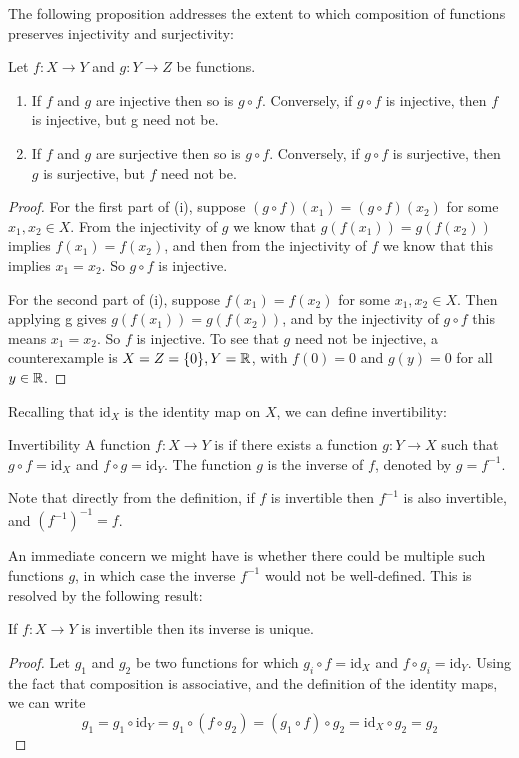 The following proposition addresses the extent to which composition of functions preserves injectivity and surjectivity:
\begin{proposition}
Let $f:X\to Y$ and $g:Y\to Z$ be functions.
\begin{enumerate}[label=(\roman*)]
\item If $f$ and $g$ are injective then so is $g \circ f$. Conversely, if $g \circ f$ is injective, then $f$ is injective, but g need not be.
\item If $f$ and $g$ are surjective then so is $g \circ f$. Conversely, if $g \circ f$ is surjective, then $g$ is surjective, but $f$ need not be.
\end{enumerate}
\end{proposition}
\begin{proof}
For the first part of (i), suppose $(g \circ f)(x_1) = (g \circ f)(x_2)$ for some $x_1, x_2 \in X$. From the injectivity of $g$ we know that $g(f(x_1)) = g(f(x_2))$ implies $f(x_1) = f(x_2)$, and then from the injectivity of $f$ we know that this implies $x_1 = x_2$. So $g \circ f$ is injective.

For the second part of (i), suppose $f(x_1) = f(x_2)$ for some $x_1, x_2 \in X$. Then applying g gives $g(f(x_1)) = g(f(x_2))$, and by the injectivity of $g \circ f$ this means $x_1 = x_2$. So $f$ is injective. To see that $g$ need not be injective, a counterexample is $X = Z = \{0\}, Y = \mathbb R$, with $f(0) = 0$ and $g(y) = 0$ for all $y \in \mathbb R$.
\end{proof}

Recalling that $\mathrm{id}_X$ is the identity map on $X$, we can define invertibility:
\begin{defn}{Invertibility}{}
A function $f:X\to Y$ is  if there exists a function $g:Y\to X$ such that $g \circ f = \mathrm{id}_X$ and $f \circ g = \mathrm{id}_Y$. The function $g$ is the inverse of $f$, denoted by $g = f^{-1}$.
\end{defn}

Note that directly from the definition, if $f$ is invertible then $f^{-1}$ is also invertible, and $(f^{-1})^{-1} = f$.

An immediate concern we might have is whether there could be multiple such functions $g$, in which case the inverse $f^{-1}$ would not be well-defined. This is resolved by the following result:

\begin{proposition}
If $f:X \to Y$ is invertible then its inverse is unique.
\end{proposition}
\begin{proof}
Let $g_1$ and $g_2$ be two functions for which $g_i \circ f = \mathrm{id}_X$ and $f \circ g_i = \mathrm{id}_Y$. Using the fact that composition is associative, and the definition of the identity maps, we can write
\[ g_1 = g_1 \circ \mathrm{id}_Y = g_1 \circ (f \circ g_2) = (g_1 \circ f) \circ g_2 = \mathrm{id}_X \circ g_2 = g_2 \]
\end{proof}

